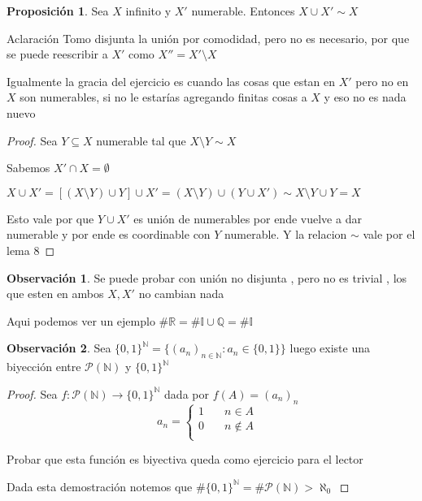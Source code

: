 \documentclass[12pt]{article}
\newcommand{\n}{\aleph_{0}}
\newcommand{\Q}{\mathbb{Q}}
\newcommand{\R}{\mathbb{R}}
\newcommand{\I}{\mathbb{I}}
\newcommand{\N}{\mathbb{N}}
\newcommand{\ra}{\rightarrow}
\theoremstyle{definition}
\newtheorem*{remark}{Observación}
\newtheorem{prop}{Proposición}
\begin{document}
\begin{prop}
  Sea $X$ infinito y $X'$ numerable. Entonces $X \cup X' \sim X$ 
 
  Aclaración Tomo disjunta la unión por comodidad, pero no es necesario, por que se puede reescribir a $X'$ como $X''=X' \setminus X $

    Igualmente la gracia del ejercicio es cuando las cosas que estan en $X'$ pero no en $X$ son numerables, si no le  estarías agregando finitas cosas a $X$ y eso no es nada nuevo

  


  \begin{proof}
   Sea $Y \subseteq X$ numerable tal que $X \setminus Y \sim X$

  Sabemos $X' \cap X = \emptyset$ 

  $X \cup X' = [(X \setminus Y) \cup Y ] \cup X' = (X \setminus Y) \cup (Y \cup X') \sim X \setminus Y \cup Y = X$

  Esto vale por que $Y \cup X'$ es unión de numerables por ende vuelve a dar numerable y por ende es coordinable con $Y$ numerable. Y la relacion $\sim$ vale por el lema 8  
   
  \end{proof}

  \begin{remark}
    Se puede probar con unión no disjunta , pero no es trivial , los que esten en ambos $X, X'$ no cambian nada
  
    Aqui podemos ver un ejemplo $\# \R = \# \I \cup \Q = \# \I$

  \end{remark}
\end{prop}


\begin{remark}
  Sea $\{0,1\}^{\N} = \{(a_{n})_{n \in \N} : a_{n} \in \{0,1\}\}$ luego existe una biyección entre $\mathcal{P}(\N)$ y $\{0,1\}^{\N}$
  
  \begin{proof}
    Sea $f: \mathcal{P}(\N) \ra \{0,1\}^{\N}$ dada por $f(A) = (a_{n})_{n}$
  \[
    a_{n} =
     \begin{cases}
       \text{$1$} &\quad\text{$n \in A$ }\\
       \text{$0$} &\quad\text{$n \notin A$} \\
     \end{cases}
\]

\noindent
Probar que esta función es biyectiva queda como ejercicio para el lector

\noindent
Dada esta demostración notemos que $\# \{0,1\}^{\N} = \# \mathcal{P}(\N) > \n$
  \end{proof}
\end{remark}
\end{document}
